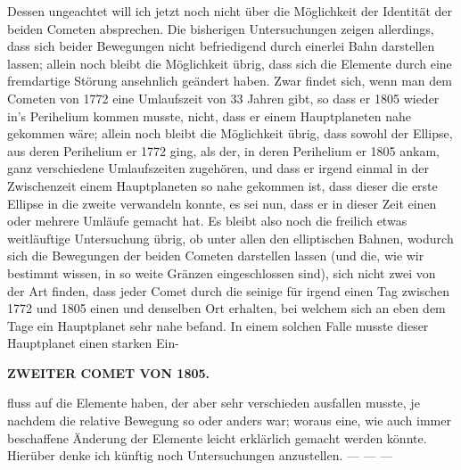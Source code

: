 \par\indent Dessen ungeachtet will ich jetzt noch nicht über die Möglichkeit der Identität der beiden Cometen
absprechen. Die bisherigen Untersuchungen zeigen allerdings, dass sich beider Bewegungen nicht
befriedigend durch einerlei Bahn darstellen lassen; allein noch bleibt die Möglichkeit übrig, dass sich
die Elemente durch eine fremdartige Störung ansehnlich geändert haben. Zwar findet sich, wenn man
dem Cometen von 1772 eine Umlaufszeit von 33 Jahren gibt, so dass er 1805 wieder in's Perihelium
kommen musste, nicht, dass er einem Hauptplaneten nahe gekommen wäre; allein noch bleibt die Möglichkeit
übrig, dass sowohl der Ellipse, aus deren Perihelium er 1772 ging, als der, in deren Perihelium er
1805 ankam, ganz verschiedene Umlaufszeiten zugehören, und dass er irgend einmal in der Zwischenzeit
einem Hauptplaneten so nahe gekommen ist, dass dieser die erste Ellipse in die zweite verwandeln konnte,
es sei nun, dass er in dieser Zeit einen oder mehrere Umläufe gemacht hat. Es bleibt also noch die
freilich etwas weitläuftige Untersuchung übrig, ob unter allen den elliptischen Bahnen, wodurch sich die
Bewegungen der beiden Cometen darstellen lassen (und die, wie wir bestimmt wissen, in so weite Gränzen
eingeschlossen sind), sich nicht zwei von der Art finden, dass jeder Comet durch die seinige für irgend
einen Tag zwischen 1772 und 1805 einen und denselben Ort erhalten, bei welchem sich an eben dem Tage
ein Hauptplanet sehr nahe befand. In einem solchen Falle musste dieser Hauptplanet einen starken Ein-\par
\clearpage
\thispagestyle{empty}
\noindent{}%
\makebox[12mm][l]{}%
\parbox[t]{\dimexpr\linewidth-24mm\relax}{\centering\footnotesize\bfseries ZWEITER COMET VON 1805.\par}%
\par\nobreak\medskip
\noindent fluss auf die Elemente haben, der aber sehr verschieden ausfallen musste, je nachdem die relative Bewegung so oder anders war; woraus eine, wie auch immer beschaffene Änderung der Elemente leicht erklärlich gemacht werden könnte. Hierüber denke ich künftig noch Untersuchungen anzustellen. --- --- ---

